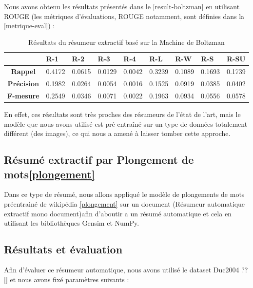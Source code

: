     Nous avons obtenu les résultats présentés dans le \autoref{result-boltzman} en utilisant ROUGE (les métriques d'évaluations, ROUGE notamment, sont définies dans la \autoref{metrique-eval}) : 
    \begin{table}[H]
        \begin{center}
            \begin{tabular}{|c|C{1.2cm}|C{1.2cm}|C{1.2cm}|C{1.2cm}|C{1.2cm}|C{1.2cm}|C{1.2cm}|C{1.2cm}|}
                 & \textbf{R-1} &  \textbf{R-2} &  \textbf{R-3} &  \textbf{R-4} &  \textbf{R-L} &  \textbf{R-W} &  \textbf{R-S} &  \textbf{R-SU} \\
                \hline
                \textbf{Rappel} & 0.4172 & 0.0615 & 0.0129 & 0.0042 & 0.3239 & 0.1089 & 0.1693 & 0.1739 \\
                \textbf{Précision} & 0.1982 & 0.0264 & 0.0054 & 0.0016 & 0.1525 & 0.0919 & 0.0385 & 0.0402 \\
                \textbf{F-mesure} & 0.2549 & 0.0346 & 0.0071 & 0.0022 & 0.1963 & 0.0934 & 0.0556 & 0.0578 \\
                \hline
            \end{tabular}
        \end{center}
        \caption{Résultats du résumeur extractif basé sur la Machine de Boltzman}
        \label{result-boltzman}
    \end{table}
    En effet, ces résultats sont très proches des résumeurs de l'état de l'art, mais le modèle que nous avons utilisé est pré-entraîné sur un type de données totalement différent (des images), ce qui nous a amené à laisser tomber cette approche.   

\subsection{Résumé extractif par Plongement de mots\ref{plongement}}
Dans ce type de résumé, nous allons appliqué le modèle de plongements de mots préentrainé de wikipédia \ref{plongement} sur un document (Résumeur automatique extractif mono document)\cite{notreresume}afin d'aboutir a un résumé automatique et cela en utilisant les bibliothèques Gensim et NumPy. 

\subsection{Résultats et évaluation}
Afin d'évaluer ce résumeur automatique, nous avons utilisé le dataset Duc2004 ??\autoref{} et nous avons fixé paramètres suivants :

